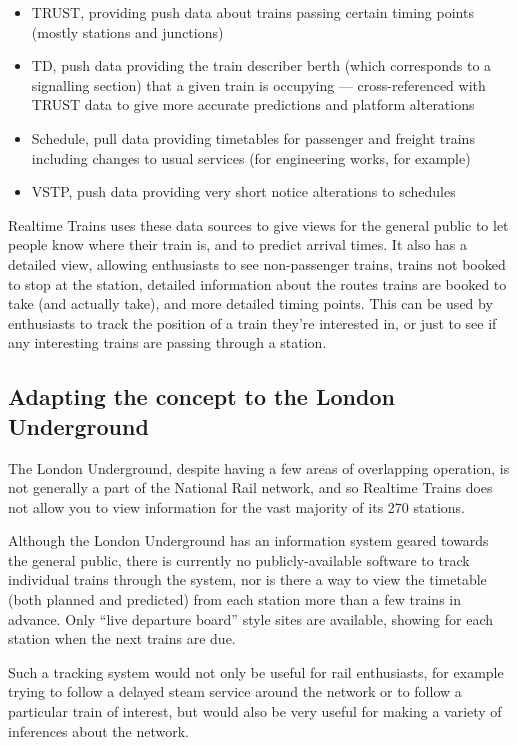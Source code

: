 \documentclass[a4paper,12pt]{article}
\begin{document}
\begin{itemize}
  \item TRUST, providing push data about trains passing certain timing points
    (mostly stations and junctions)
  \item TD, push data providing the train describer berth (which corresponds to
    a signalling section) that a given train is occupying --- cross-referenced
    with TRUST data to give more accurate predictions and platform alterations
  \item Schedule, pull data providing timetables for passenger and freight
    trains including changes to usual services (for engineering works, for
    example)
  \item VSTP, push data providing very short notice alterations to schedules
\end{itemize}

Realtime Trains uses these data sources to give views for the general public to
let people know where their train is, and to predict arrival times. It also has
a detailed view, allowing enthusiasts to see non-passenger trains, trains not
booked to stop at the station, detailed information about the routes trains are
booked to take (and actually take), and more detailed timing points. This can
be used by enthusiasts to track the position of a train they're interested in,
or just to see if any interesting trains are passing through a station.

\subsection{Adapting the concept to the London Underground}

The London Underground, despite having a few areas of overlapping operation, is
not generally a part of the National Rail network, and so Realtime Trains does
not allow you to view information for the vast majority of its 270 stations.

Although the London Underground has an information system geared towards the
general public, there is currently no publicly-available software to track
individual trains through the system, nor is there a way to view the timetable
(both planned and predicted) from each station more than a few trains in
advance. Only ``live departure board'' style sites are available, showing for
each station when the next trains are due.

Such a tracking system would not only be useful for rail enthusiasts, for
example trying to follow a delayed steam service around the network or to
follow a particular train of interest, but would also be very useful for making
a variety of inferences about the network.
\end{document}
